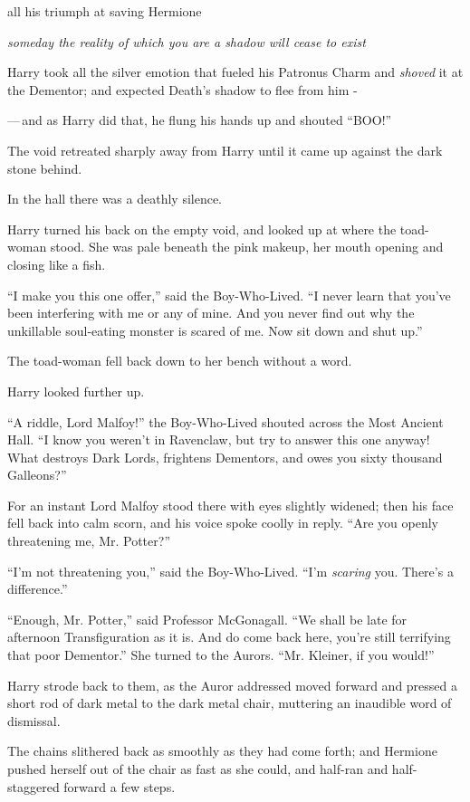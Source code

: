 all his triumph at saving Hermione

\emph{someday the reality of which you are a shadow will cease to exist}

Harry took all the silver emotion that fueled his Patronus Charm and \emph{shoved} it at the Dementor; and expected Death's shadow to flee from him -

---\,and as Harry did that, he flung his hands up and shouted ``BOO!''

The void retreated sharply away from Harry until it came up against the dark stone behind.

In the hall there was a deathly silence.

Harry turned his back on the empty void, and looked up at where the toad-woman stood. She was pale beneath the pink makeup, her mouth opening and closing like a fish.

``I make you this one offer,'' said the Boy-Who-Lived. ``I never learn that you've been interfering with me or any of mine. And you never find out why the unkillable soul-eating monster is scared of me. Now sit down and shut up.''

The toad-woman fell back down to her bench without a word.

Harry looked further up.

``A riddle, Lord Malfoy!'' the Boy-Who-Lived shouted across the Most Ancient Hall. ``I know you weren't in Ravenclaw, but try to answer this one anyway! What destroys Dark Lords, frightens Dementors, and owes you sixty thousand Galleons?''

For an instant Lord Malfoy stood there with eyes slightly widened; then his face fell back into calm scorn, and his voice spoke coolly in reply. ``Are you openly threatening me, Mr. Potter?''

``I'm not threatening you,'' said the Boy-Who-Lived. ``I'm \emph{scaring} you. There's a difference.''

``Enough, Mr. Potter,'' said Professor McGonagall. ``We shall be late for afternoon Transfiguration as it is. And do come back here, you're still terrifying that poor Dementor.'' She turned to the Aurors. ``Mr. Kleiner, if you would!''

Harry strode back to them, as the Auror addressed moved forward and pressed a short rod of dark metal to the dark metal chair, muttering an inaudible word of dismissal.

The chains slithered back as smoothly as they had come forth; and Hermione pushed herself out of the chair as fast as she could, and half-ran and half-staggered forward a few steps.

